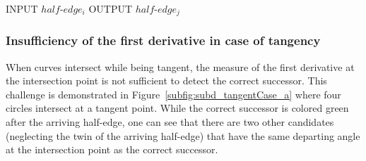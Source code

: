 \td{}
\begin{algorithm}
  \caption {$find\_successor$}
  \label{alg:partitioning}
  \begin{algorithmic}
    \STATE INPUT  $half\text{-}edge_i$
    \STATE OUTPUT  $half\text{-}edge_j$
  \end{algorithmic}
\end{algorithm}


\subsubsection{Insufficiency of the first derivative in case of tangency}

When curves intersect while being tangent, the measure of the first derivative at the intersection point is not sufficient to detect the correct successor.
This challenge is demonstrated in Figure~\ref{subfig:subd_tangentCase_a} where four circles intersect at a tangent point.
While the correct successor is colored green after the arriving half-edge, one can see that there are two other candidates (neglecting the twin of the arriving half-edge) that have the same departing angle at the intersection point as the correct successor.\bigskip

